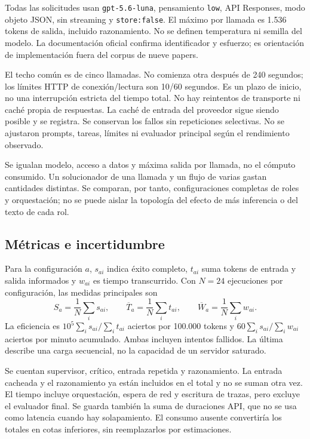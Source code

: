 Todas las solicitudes usan \texttt{gpt-5.6-luna}, pensamiento \texttt{low}, API Responses, modo objeto JSON, sin streaming y \texttt{store:false}. El máximo por llamada es 1.536 tokens de salida, incluido razonamiento. No se definen temperatura ni semilla del modelo. La documentación oficial confirma identificador y esfuerzo; es orientación de implementación fuera del corpus de nueve papers.

El techo común es de cinco llamadas. No comienza otra después de 240 segundos; los límites HTTP de conexión/lectura son 10/60 segundos. Es un plazo de inicio, no una interrupción estricta del tiempo total. No hay reintentos de transporte ni caché propia de respuestas. La caché de entrada del proveedor sigue siendo posible y se registra. Se conservan los fallos sin repeticiones selectivas. No se ajustaron prompts, tareas, límites ni evaluador principal según el rendimiento observado.

Se igualan modelo, acceso a datos y máxima salida por llamada, no el cómputo consumido. Un solucionador de una llamada y un flujo de varias gastan cantidades distintas. Se comparan, por tanto, configuraciones completas de roles y orquestación; no se puede aislar la topología del efecto de más inferencia o del texto de cada rol.

\subsection{Métricas e incertidumbre}
Para la configuración $a$, $s_{ai}$ indica éxito completo, $t_{ai}$ suma tokens de entrada y salida informados y $w_{ai}$ es tiempo transcurrido. Con $N=24$ ejecuciones por configuración, las medidas principales son
\begin{equation}
S_a=\frac{1}{N}\sum_i s_{ai},\qquad
\overline T_a=\frac{1}{N}\sum_i t_{ai},\qquad
\overline W_a=\frac{1}{N}\sum_i w_{ai}.
\end{equation}
La eficiencia es $10^5\sum_i s_{ai}/\sum_i t_{ai}$ aciertos por 100.000 tokens y $60\sum_i s_{ai}/\sum_i w_{ai}$ aciertos por minuto acumulado. Ambas incluyen intentos fallidos. La última describe una carga secuencial, no la capacidad de un servidor saturado.

Se cuentan supervisor, crítico, entrada repetida y razonamiento. La entrada cacheada y el razonamiento ya están incluidos en el total y no se suman otra vez. El tiempo incluye orquestación, espera de red y escritura de trazas, pero excluye el evaluador final. Se guarda también la suma de duraciones API, que no se usa como latencia cuando hay solapamiento. El consumo ausente convertiría los totales en cotas inferiores, sin reemplazarlos por estimaciones.

